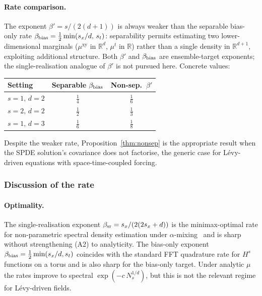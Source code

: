 \documentclass[review,12pt]{elsarticle}
\begin{document}
\paragraph{Rate comparison.}
The exponent \(\beta' = s/(2(d+1))\) is always weaker than the
separable bias-only rate
\(\beta_{\rm bias} = \tfrac12\min(s_x/d,\,s_t)\): separability permits
estimating two lower-dimensional marginals (\(\mu^{\mathrm{xy}}\) in
\(\mathbb R^d\), \(\mu^t\) in \(\mathbb R\)) rather than a single
density in \(\mathbb R^{d+1}\), exploiting additional structure. Both
\(\beta'\) and \(\beta_{\rm bias}\) are ensemble-target exponents; the
single-realisation analogue of \(\beta'\) is not pursued here.
Concrete values:
\begin{center}
\begin{tabular}{lcc}
\toprule
Setting & Separable \(\beta_{\rm bias}\) & Non-sep.\ \(\beta'\) \\
\midrule
\(s=1,\,d=2\) & \(\tfrac14\) & \(\tfrac16\) \\
\(s=2,\,d=2\) & \(\tfrac12\) & \(\tfrac13\) \\
\(s=1,\,d=3\) & \(\tfrac16\) & \(\tfrac18\) \\
\bottomrule
\end{tabular}
\end{center}
Despite the weaker rate, Proposition~\ref{thm:nonsep} is the
appropriate result when the SPDE solution's covariance does not
factorise, the generic case for L\'evy-driven equations with
space-time-coupled forcing.

\subsubsection{Discussion of the rate}

\paragraph{Optimality.}
The single-realisation exponent
\(\beta_{\rm sr} = s_x/(2(2s_x+d))\) is the minimax-optimal rate for
non-parametric spectral density estimation under
$\alpha$-mixing~\cite{Dahlhaus1996} and is sharp without
strengthening (A2) to analyticity. The bias-only exponent
\(\beta_{\rm bias} = \tfrac12\min(s_x/d, s_t)\) coincides with the
standard FFT quadrature rate for $H^s$ functions on a torus and is
also sharp for the bias-only target. Under analytic $\mu$ the
rates improve to spectral $\exp(-c\,N_s^{1/d})$, but this is not
the relevant regime for L\'evy-driven fields.
\end{document}
